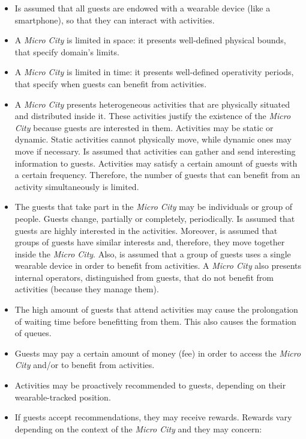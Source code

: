 \begin{itemize}
    \item Is assumed that all guests are endowed with a wearable device (like a smartphone), so that they can interact with activities.
    \item A \textit{Micro City} is limited in space: it presents well-defined physical bounds, that specify domain's limits.
    \item A \textit{Micro City} is limited in time: it presents well-defined operativity periods, that specify when guests can benefit from activities.
    \item A \textit{Micro City} presents heterogeneous activities that are physically situated and distributed inside it. These activities justify the existence of the \textit{Micro City} because guests are interested in them. Activities may be static or dynamic. Static activities cannot physically move, while dynamic ones may move if necessary. Is assumed that activities can gather and send interesting information to guests. Activities may satisfy a certain amount of guests with a certain frequency. Therefore, the number of guests that can benefit from an activity simultaneously is limited.
    \item The guests that take part in the \textit{Micro City} may be individuals or group of people. Guests change, partially or completely, periodically. Is assumed that guests are highly interested in the activities. Moreover, is assumed that groups of guests have similar interests and, therefore, they move together inside the \textit{Micro City}. Also, is assumed that a group of guests uses a single wearable device in order to benefit from activities. A \textit{Micro City} also presents internal operators, distinguished from guests, that do not benefit from activities (because they manage them).
    \item The high amount of guests that attend activities may cause the prolongation of waiting time before benefitting from them. This also causes the formation of queues.
    \item Guests may pay a certain amount of money (fee) in order to access the \textit{Micro City} and/or to benefit from activities.
    \item Activities may be proactively recommended to guests, depending on their wearable-tracked position.
    \item If guests accept recommendations, they may receive rewards. Rewards vary depending on the context of the \textit{Micro City} and they may concern:

\end{itemize}
